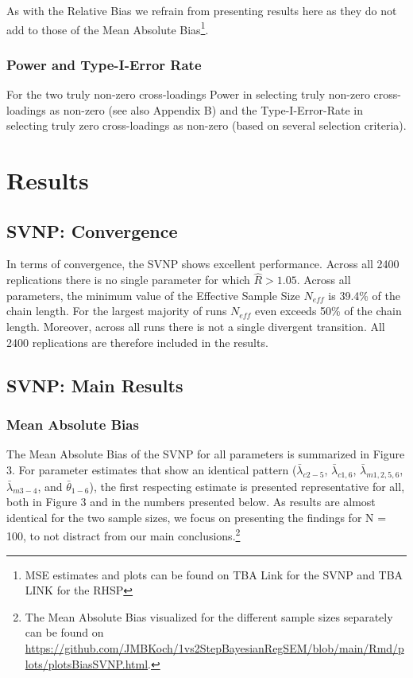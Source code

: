 \documentclass[
  man, donotrepeattitle,floatsintext]{apa6}
\begin{document}
As with the Relative Bias we refrain from presenting results here as they do not add to those of the Mean Absolute Bias\footnote{MSE estimates and plots can be found on TBA Link for the SVNP and TBA LINK for the RHSP}.

\hypertarget{power-and-type-i-error-rate}{%
\subsubsection{Power and Type-I-Error Rate}\label{power-and-type-i-error-rate}}

For the two truly non-zero cross-loadings Power in selecting truly non-zero cross-loadings as non-zero (see also Appendix B) and the Type-I-Error-Rate in selecting truly zero cross-loadings as non-zero (based on several selection criteria).

\hypertarget{results}{%
\section{Results}\label{results}}

\hypertarget{svnp-convergence}{%
\subsection{SVNP: Convergence}\label{svnp-convergence}}

In terms of convergence, the SVNP shows excellent performance. Across all 2400 replications there is no single parameter for which \(\hat{R} > 1.05\). Across all parameters, the minimum value of the Effective Sample Size \(N_{eff}\) is 39.4\% of the chain length. For the largest majority of runs \(N_{eff}\) even exceeds 50\% of the chain length. Moreover, across all runs there is not a single divergent transition. All 2400 replications are therefore included in the results.

\hypertarget{svnp-main-results}{%
\subsection{SVNP: Main Results}\label{svnp-main-results}}

\hypertarget{mean-absolute-bias-1}{%
\subsubsection{Mean Absolute Bias}\label{mean-absolute-bias-1}}

The Mean Absolute Bias of the SVNP for all parameters is summarized in Figure 3. For parameter estimates that show an identical pattern (\(\bar{\lambda}_{c 2-5}\), \(\bar{\lambda}_{c 1, 6}\), \(\bar{\lambda}_{m 1, 2, 5, 6}\), \(\bar{\lambda}_{m 3-4}\), and \(\bar{\theta}_{1-6}\)), the first respecting estimate is presented representative for all, both in Figure 3 and in the numbers presented below. As results are almost identical for the two sample sizes, we focus on presenting the findings for N = 100, to not distract from our main conclusions.\footnote{The Mean Absolute Bias visualized for the different sample sizes separately can be found on \url{https://github.com/JMBKoch/1vs2StepBayesianRegSEM/blob/main/Rmd/plots/plotsBiasSVNP.html}.}
\end{document}
